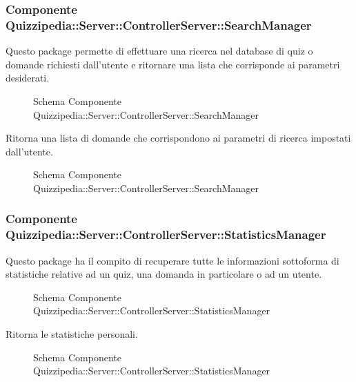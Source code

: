\subsubsection{Componente Quizzipedia::Server::ControllerServer::SearchManager}
Questo package permette di effettuare una ricerca nel database di quiz o domande richiesti dall'utente e ritornare una lista che corrisponde ai parametri desiderati.
\begin{figure}[H]
\centering
\noindent{}
\caption{Schema Componente Quizzipedia::Server::ControllerServer::SearchManager}
\end{figure}
Ritorna una lista di domande che corrispondono ai parametri di ricerca impostati dall'utente.
\begin{figure}[H]
\centering
\noindent{}
\caption{Schema Componente Quizzipedia::Server::ControllerServer::SearchManager}
\end{figure}
\subsubsection{Componente Quizzipedia::Server::ControllerServer::StatisticsManager}
Questo package ha il compito di recuperare tutte le informazioni sottoforma di statistiche relative ad un quiz, una domanda in particolare o ad un utente.
\begin{figure}[H]
\centering
\noindent{}
\caption{Schema Componente Quizzipedia::Server::ControllerServer::StatisticsManager}
\end{figure}
Ritorna le statistiche personali.
\begin{figure}[H]
\centering
\noindent{}
\caption{Schema Componente Quizzipedia::Server::ControllerServer::StatisticsManager}
\end{figure}
